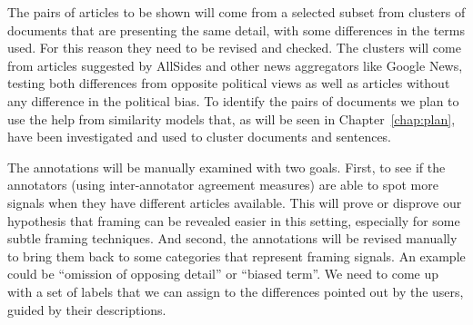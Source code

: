 The pairs of articles to be shown will come from a selected subset from clusters of documents that are presenting the same detail, with some differences in the terms used. For this reason they need to be revised and checked.
The clusters will come from articles suggested by AllSides and other news aggregators like Google News, testing both differences from opposite political views as well as articles without any difference in the political bias.
To identify the pairs of documents we plan to use the help from similarity models that, as will be seen in Chapter~\ref{chap:plan}, have been investigated and used to cluster documents and sentences.





The annotations will be manually examined with two goals.
First, to see if the annotators (using inter-annotator agreement measures) are able to spot more signals when they have different articles available.
This will prove or disprove our hypothesis that framing can be revealed easier in this setting, especially for some subtle framing techniques.
And second, the annotations will be revised manually to bring them back to some categories that represent framing signals. An example could be ``omission of opposing detail'' or ``biased term''. We need to come up with a set of labels that we can assign to the differences pointed out by the users, guided by their descriptions.



